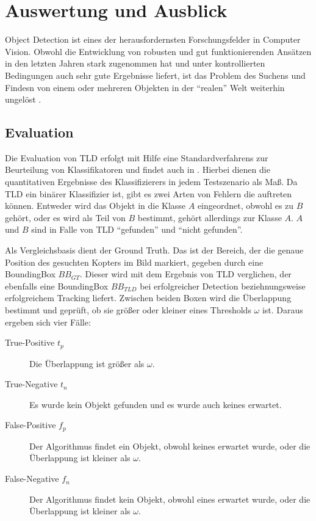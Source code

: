 \section{Auswertung und Ausblick}
	Object Detection ist eines der herausfordernsten Forschungsfelder in Computer Vision. Obwohl die Entwicklung von robusten und gut funktionierenden Ansätzen in den letzten Jahren stark zugenommen hat und unter kontrollierten Bedingungen auch sehr gute Ergebnisse liefert, ist das Problem des Suchens und Findesn von einem oder mehreren Objekten in der ``realen'' Welt weiterhin ungelöst \cite{ODS}.

\subsection{Evaluation}
	Die Evaluation von TLD erfolgt mit Hilfe eine Standardverfahrens zur Beurteilung von Klassifikatoren und findet auch in \cite{TLD}. Hierbei dienen die quantitativen Ergebnisse des Klassifizierers in jedem Testszenario als Maß. Da TLD ein binärer Klassifizier ist, gibt es zwei Arten von Fehlern die auftreten können. Entweder wird das Objekt in die Klasse $A$ eingeordnet, obwohl es zu $B$ gehört, oder es wird als Teil von $B$ bestimmt, gehört allerdings zur Klasse $A$. $A$ und $B$ sind in Falle von TLD ``gefunden'' und ``nicht gefunden''.

	Als Vergleichsbasis dient der Ground Truth. Das ist der Bereich, der die genaue Position des gesuchten Kopters im Bild markiert, gegeben durch eine BoundingBox $BB_{GT}$. Dieser wird mit dem Ergebnis von TLD verglichen, der ebenfalls eine BoundingBox $BB_{TLD}$ bei erfolgreicher Detection beziehnungsweise erfolgreichem Tracking liefert. Zwischen beiden Boxen wird die Überlappung bestimmt und geprüft, ob sie größer oder kleiner eines Thresholds $\omega$ ist. Daraus ergeben sich vier Fälle:

	\begin{description}
		\item [True-Positive $t_p$] Die Überlappung ist größer als $\omega$.
		\item [True-Negative $t_n$] Es wurde kein Objekt gefunden und es wurde auch keines erwartet.
		\item [False-Positive $f_p$] Der Algorithmus findet ein Objekt, obwohl keines erwartet wurde, oder die Überlappung ist kleiner als $\omega$.
		\item [False-Negative $f_n$] Der Algorithmus findet kein Objekt, obwohl eines erwartet wurde, oder die Überlappung ist kleiner als $\omega$.
	\end{description}

